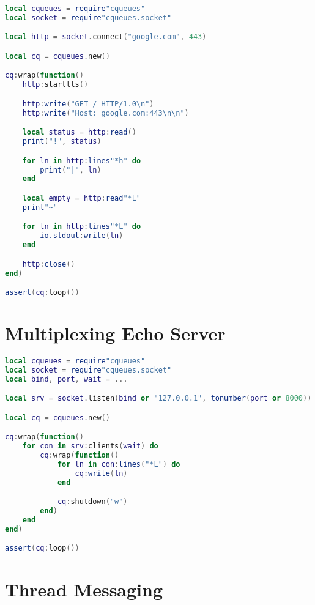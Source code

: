\documentclass[11pt, oneside]{memoir}
\begin{document}
\begin{lstlisting}[language=lua]
local cqueues = require"cqueues"
local socket = require"cqueues.socket"

local http = socket.connect("google.com", 443)

local cq = cqueues.new()

cq:wrap(function()
	http:starttls()

	http:write("GET / HTTP/1.0\n")
	http:write("Host: google.com:443\n\n")

	local status = http:read()
	print("!", status)

	for ln in http:lines"*h" do
		print("|", ln)
	end

	local empty = http:read"*L"
	print"~"

	for ln in http:lines"*L" do
		io.stdout:write(ln)
	end

	http:close()
end)

assert(cq:loop())
\end{lstlisting}


\clearpage
\section{Multiplexing Echo Server}

\begin{lstlisting}[language=lua]
local cqueues = require"cqueues"
local socket = require"cqueues.socket"
local bind, port, wait = ...

local srv = socket.listen(bind or "127.0.0.1", tonumber(port or 8000))

local cq = cqueues.new()

cq:wrap(function()
	for con in srv:clients(wait) do
		cq:wrap(function()
			for ln in con:lines("*L") do
				cq:write(ln)
			end

			cq:shutdown("w")
		end)
	end
end)

assert(cq:loop())
\end{lstlisting}

\clearpage
\section{Thread Messaging}
\end{document}
